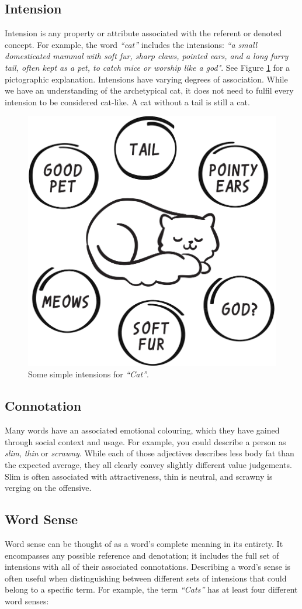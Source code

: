 \subsection{Intension}
Intension is any property or attribute associated with the referent or denoted concept. For example, the word \textit{``cat''} includes the intensions: \textit{``a small domesticated mammal with soft fur, sharp claws, pointed ears, and a long furry tail, often kept as a pet, to catch mice or worship like a god"}. See Figure \ref{dog} for a pictographic explanation. Intensions have varying degrees of association. While we have an understanding of the archetypical cat, it does not need to fulfil every intension to be considered cat-like. A cat without a tail is still a cat.

\begin{figure}[h]
    \centering
    \includegraphics[width=0.6\linewidth]{graphics/cat-intensions.png}
    \caption{Some simple intensions for \textit{``Cat''}.}
    \label{dog}
\end{figure}

\subsection{Connotation}
Many words have an associated emotional colouring, which they have gained through social context and usage. For example, you could describe a person as \textit{slim}, \textit{thin} or \textit{scrawny}. While each of those adjectives describes less body fat than the expected average, they all clearly convey slightly different value judgements. Slim is often associated with attractiveness, thin is neutral, and scrawny is verging on the offensive.

\subsection{Word Sense}
Word sense can be thought of as a word's complete meaning in its entirety. It encompasses any possible reference and denotation; it includes the full set of intensions with all of their associated connotations. Describing a word's sense is often useful when distinguishing between different sets of intensions that could belong to a specific term. For example, the term \textit{``Cats''} has at least four different word senses:

